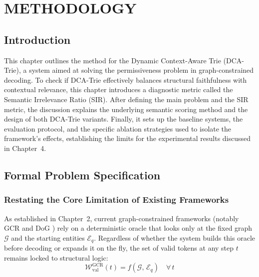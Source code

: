 
\chapter{METHODOLOGY}
\label{Chapter3}

\section{Introduction}
\label{sec:ch3intro}

This chapter outlines the method for the Dynamic Context-Aware Trie (DCA-Trie), a system aimed at solving the permissiveness problem in graph-constrained decoding. To check if DCA-Trie effectively balances structural faithfulness with contextual relevance, this chapter introduces a diagnostic metric called the Semantic Irrelevance Ratio (SIR). After defining the main problem and the SIR metric, the discussion explains the underlying semantic scoring method and the design of both DCA-Trie variants. Finally, it sets up the baseline systems, the evaluation protocol, and the specific ablation strategies used to isolate the framework's effects, establishing the limits for the experimental results discussed in Chapter~4.

\section{Formal Problem Specification}
\label{sec:ch3problem}

\subsection{Restating the Core Limitation of Existing Frameworks}

As established in Chapter~2, current graph-constrained frameworks (notably GCR \citep{luo2025-graph-constrained-reasoning} and DoG \citep{li2024-decoding-on-graphs}) rely on a deterministic oracle that looks only at the fixed graph $\mathcal{G}$ and the starting entities $\mathcal{E}_q$. Regardless of whether the system builds this oracle before decoding or expands it on the fly, the set of valid tokens at any step $t$ remains locked to structural logic:
\begin{equation}
  \mathcal{W}_{\text{val}}^{\text{GCR}}(t) = f(\mathcal{G},\, \mathcal{E}_q)
  \quad \forall\, t
  \label{eq:gcr_oracle}
\end{equation}

